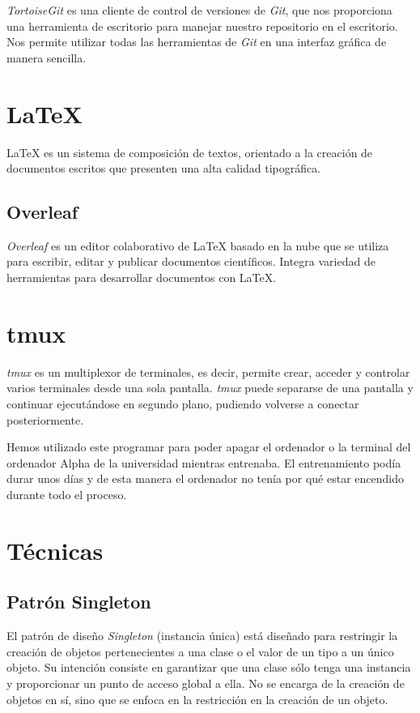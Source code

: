 \textit{TortoiseGit} es una cliente de control de versiones de \textit{Git}, que nos proporciona una herramienta de escritorio para manejar nuestro repositorio en el escritorio. Nos permite utilizar todas las herramientas de \textit{Git} en una interfaz gráfica de manera sencilla.

\section{\LaTeX}

\LaTeX{} \cite{wiki:latex} es un sistema de composición de textos, orientado a la creación de documentos escritos que presenten una alta calidad tipográfica.

\subsection{Overleaf}

\textit{Overleaf} es un editor colaborativo de \LaTeX{} basado en la nube que se utiliza para escribir, editar y publicar documentos científicos. Integra variedad de herramientas para desarrollar documentos con \LaTeX{}.

\section{tmux}

\textit{tmux} \cite{tmux:repositorio} es un multiplexor de terminales, es decir, permite crear, acceder y controlar varios terminales desde una sola pantalla. \textit{tmux} puede separarse de una pantalla y continuar ejecutándose en segundo plano, pudiendo volverse a conectar posteriormente.

Hemos utilizado este programar para poder apagar el ordenador o la terminal del ordenador Alpha de la universidad mientras entrenaba. El entrenamiento podía durar unos días y de esta manera el ordenador no tenía por qué estar encendido durante todo el proceso.

\section{Técnicas}

\subsection{Patrón Singleton}

El patrón de diseño \textit{Singleton} \cite{TyH:singleton} (instancia única) está diseñado para restringir la creación de objetos pertenecientes a una clase o el valor de un tipo a un único objeto. Su intención consiste en garantizar que una clase sólo tenga una instancia y proporcionar un punto de acceso global a ella. No se encarga de la creación de objetos en sí, sino que se enfoca en la restricción en la creación de un objeto.

